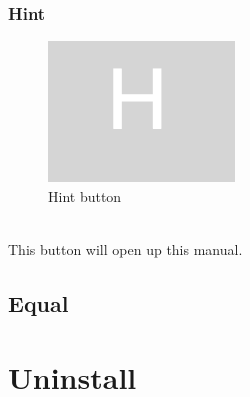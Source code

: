 \documentclass[11pt, a4paper]{article}
\begin{document}
    \subsubsection[scale = 0.2]{Hint}


    \begin{figure}[h]
        \includegraphics[scale = 0.2]{hint}
        \caption{Hint button}
        \centering
        \label{fig:h}
    \end{figure}
    \\
    This button will open up this manual.

    \newpage

    \subsection{Equal}


    \section{Uninstall}
\end{document}
